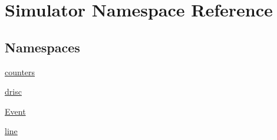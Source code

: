\hypertarget{namespace_simulator}{\section{Simulator Namespace Reference}
\label{namespace_simulator}
}
\subsection*{Namespaces}
\begin{DoxyCompactItemize}
\item 
 \hyperlink{namespace_simulator_1_1counters}{counters}
\item 
 \hyperlink{namespace_simulator_1_1drisc}{drisc}
\item 
 \hyperlink{namespace_simulator_1_1_event}{Event}
\item 
 \hyperlink{namespace_simulator_1_1line}{line}
\end{DoxyCompactItemize}
